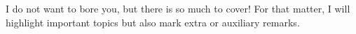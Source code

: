 I do not want to bore you, but there is so much to cover! For that
matter, I will highlight important topics but also mark extra or auxiliary remarks.

